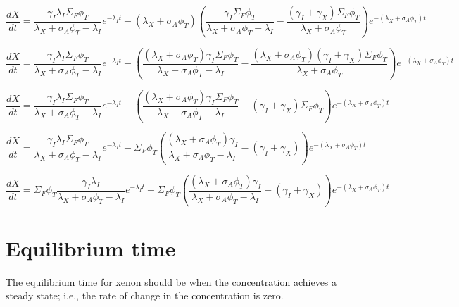 \documentclass[11pt,a4paper]{article}
\begin{document}
\begin{equation} 
    \frac{dX}{dt}=
        \frac{\gamma_I\lambda_I\Sigma_F\phi_T}{\lambda_X+\sigma_A\phi_T-\lambda_I}e^{-\lambda_I t}
        -(\lambda_X+\sigma_A\phi_T)(\frac{\gamma_I\Sigma_F\phi_T}{\lambda_X+\sigma_A\phi_T-\lambda_I}
        -\frac{(\gamma_I+\gamma_X)\Sigma_F\phi_T}{\lambda_X+\sigma_A\phi_T})e^{-(\lambda_X+\sigma_A\phi_T)t}
\end{equation}

\begin{equation} 
    \frac{dX}{dt}=
        \frac{\gamma_I\lambda_I\Sigma_F\phi_T}{\lambda_X+\sigma_A\phi_T-\lambda_I}e^{-\lambda_I t}
        -(\frac{(\lambda_X+\sigma_A\phi_T)\gamma_I\Sigma_F\phi_T}{\lambda_X+\sigma_A\phi_T-\lambda_I}
        -\frac{(\lambda_X+\sigma_A\phi_T)(\gamma_I+\gamma_X)\Sigma_F\phi_T}{\lambda_X+\sigma_A\phi_T})e^{-(\lambda_X+\sigma_A\phi_T)t}
\end{equation}

\begin{equation} 
    \frac{dX}{dt}=
        \frac{\gamma_I\lambda_I\Sigma_F\phi_T}{\lambda_X+\sigma_A\phi_T-\lambda_I}e^{-\lambda_I t}
        -(\frac{(\lambda_X+\sigma_A\phi_T)\gamma_I\Sigma_F\phi_T}{\lambda_X+\sigma_A\phi_T-\lambda_I}
        -(\gamma_I+\gamma_X)\Sigma_F\phi_T)e^{-(\lambda_X+\sigma_A\phi_T)t}
\end{equation}

\begin{equation} 
    \frac{dX}{dt}=
        \frac{\gamma_I\lambda_I\Sigma_F\phi_T}{\lambda_X+\sigma_A\phi_T-\lambda_I}e^{-\lambda_I t}
        -\Sigma_F\phi_T(\frac{(\lambda_X+\sigma_A\phi_T)\gamma_I}{\lambda_X+\sigma_A\phi_T-\lambda_I}
        -(\gamma_I+\gamma_X))e^{-(\lambda_X+\sigma_A\phi_T)t}
\end{equation}

\begin{equation} 
    \frac{dX}{dt}=
        \Sigma_F\phi_T\frac{\gamma_I\lambda_I}{\lambda_X+\sigma_A\phi_T-\lambda_I}e^{-\lambda_I t}
        -\Sigma_F\phi_T(\frac{(\lambda_X+\sigma_A\phi_T)\gamma_I}{\lambda_X+\sigma_A\phi_T-\lambda_I}
        -(\gamma_I+\gamma_X))e^{-(\lambda_X+\sigma_A\phi_T)t}
\end{equation}

\newpage

\section{Equilibrium time}
The equilibrium time for xenon should be when the concentration achieves a steady state; i.e., the rate of change in the concentration is zero.
\end{document}
